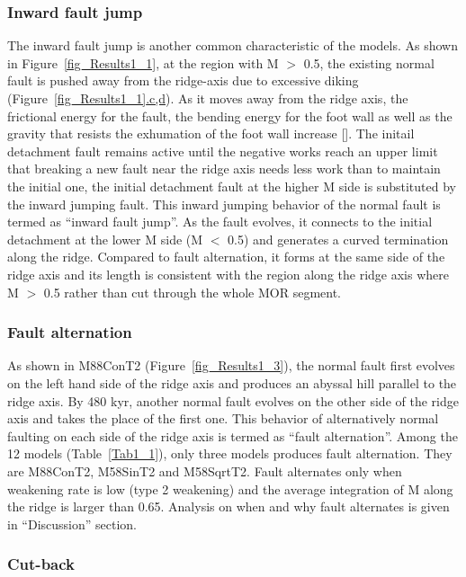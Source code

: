 \subsubsection{Inward fault jump}
The inward fault jump is another common characteristic of the models. As shown in Figure~\hyperref[fig_Results1_1]{\ref{fig_Results1_1}}, at the region with M $>$ 0.5, the existing normal fault is pushed away from the ridge-axis due to excessive diking (Figure~\hyperref[fig_Results1_1]{\ref{fig_Results1_1}.c,d}). As it moves away from the ridge axis, the frictional energy for the fault, the bending energy for the foot wall as well as the gravity that resists the exhumation of the foot wall increase [\citealp{Lavier2000, Olive2014}]. The initail detachment fault remains active until the negative works reach an upper limit that breaking a new fault near the ridge axis needs less work than to maintain the initial one, the initial detachment fault at the higher M side is substituted by the inward jumping fault. This inward jumping behavior of the normal fault is termed as ``inward fault jump''. As the fault evolves, it connects to the initial detachment at the lower M side (M $<$ 0.5) and generates a curved termination along the ridge. Compared to fault alternation, it forms at the same side of the ridge axis and its length is consistent with the region along the ridge axis where M $>$ 0.5 rather than cut through the whole MOR segment.
\subsubsection{Fault alternation}
As shown in M88ConT2 (Figure~\hyperref[fig_Results1_3]{\ref{fig_Results1_3}}), the normal fault first evolves on the left hand side of the ridge axis and produces an abyssal hill parallel to the ridge axis. By 480 kyr, another normal fault evolves on the other side of the ridge axis and takes the place of the first one. This behavior of alternatively normal faulting on each side of the ridge axis is termed as ``fault alternation''. Among the 12 models (Table~\hyperref[Tab1_1]{\ref{Tab1_1}}), only three models produces fault alternation. They are M88ConT2, M58SinT2 and M58SqrtT2. Fault alternates only when weakening rate is low (type 2 weakening) and the average integration of M along the ridge is larger than 0.65. Analysis on when and why fault alternates is given in ``Discussion'' section.

\subsubsection{Cut-back}

